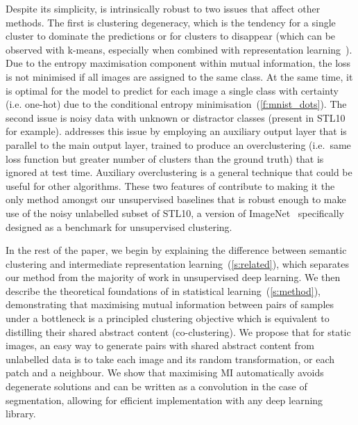 Despite its simplicity, \methodnameshort is intrinsically robust to two issues that affect other methods.
The first is clustering degeneracy, which is the tendency for a single cluster to dominate the predictions or for clusters to disappear (which can be observed with k-means, especially when combined with representation learning~\cite{caron2018deep}).
Due to the entropy maximisation component within mutual information, the loss is not minimised if all images are assigned to the same class. At the same time, it is optimal for the model to predict for each image a single class with certainty (i.e. one-hot) due to the conditional entropy minimisation~(\cref{f:mnist_dots}). The second issue is noisy data with unknown or distractor classes (present in STL10~\cite{coates2011analysis} for example).
\methodnameshort addresses this issue by employing an auxiliary output layer that is parallel to the main output layer, trained to produce an overclustering (i.e.\ same loss function but greater number of clusters than the ground truth) that is ignored at test time.
Auxiliary overclustering is a general technique that could be useful for other algorithms.
These two features of \methodnameshort contribute to making it the only method amongst our unsupervised baselines that is robust enough to make use of the noisy unlabelled subset of STL10, a version of ImageNet~\cite{deng2009imagenet} specifically designed as a benchmark for unsupervised clustering.

In the rest of the paper, we begin by explaining the difference between semantic clustering and intermediate representation learning~(\cref{s:related}), which separates our method from the majority of work in unsupervised deep learning. 
We then describe the theoretical foundations of \methodnameshort in statistical learning~(\cref{s:method}), demonstrating that maximising mutual information between pairs of samples under a bottleneck is a principled clustering objective which is equivalent to distilling their shared abstract content (co-clustering).
We propose that for static images, an easy way to generate pairs with shared abstract content from unlabelled data is to take each image and its random transformation, or each patch and a neighbour.
We show that maximising MI automatically avoids degenerate solutions and can be written as a convolution in the case of segmentation, allowing for efficient implementation with any deep learning library.


